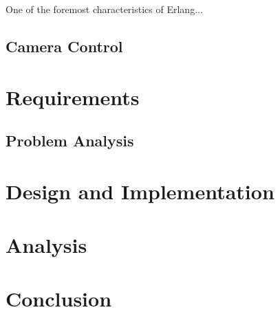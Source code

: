 \documentclass{l4proj}
\begin{document}
One of the foremost characteristics of Erlang...
\section{Camera Control}


\chapter{Requirements}
\label{reqs}
\section{Problem Analysis}



\chapter{Design and Implementation}
\label{design}

\chapter{Analysis}

\chapter{Conclusion}
\label{conclusion}




\end{document}
